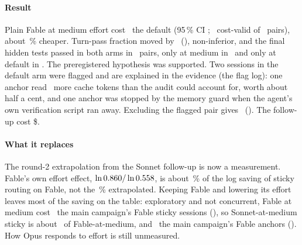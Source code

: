 \paragraph{Result} Plain Fable at medium effort cost \EfRatio\X\ the default (95\,\% CI \EfCI; \EfValid\ cost-valid of
\EfPairs\ pairs), about \EfCutPct\,\% cheaper. Turn-pass fraction moved by \EfQual\ (\EfQualCI), non-inferior, and the
final hidden tests passed in both arms in \EfFinalBoth\ pairs, only at medium in \EfFinalMed\ and only at default in
\EfFinalDef. The preregistered hypothesis was supported. Two sessions in the default arm were flagged and are explained
in the evidence (the flag log): one anchor read \EfSurplusTokens\ more cache tokens than the audit could account
for, worth about half a cent, and one anchor was stopped by the memory guard when the agent's own verification script
ran away. Excluding the flagged pair gives \EfStrict\ (\EfStrictCI). The follow-up cost \$\EfSpend.

\paragraph{What it replaces} The round-2 extrapolation from the Sonnet follow-up is now a measurement. Fable's own
effort effect, $\ln 0.860 / \ln 0.558$, is about \EfShare\,\% of the log saving of sticky routing on
Fable, not the \RgEffShareFable\,\% extrapolated. Keeping Fable and lowering its effort leaves most of the saving on the
table: exploratory and not concurrent, Fable at medium cost \EfVsSticky\X\ the main campaign's Fable sticky sessions
(\EfVsStickyCI), so Sonnet-at-medium sticky is about \EfStickyVsMedium\X\ of Fable-at-medium, and \EfVsAnchor\X\ the
main campaign's Fable anchors (\EfVsAnchorCI). How Opus responds to effort is still unmeasured.
